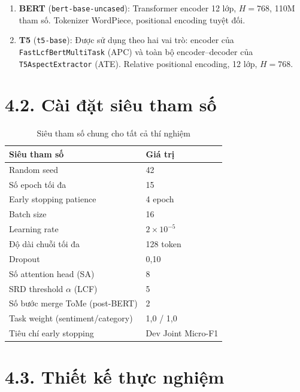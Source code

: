\begin{enumerate}
  \item \textbf{BERT} (\texttt{bert-base-uncased}): Transformer encoder
        12 lớp, $H{=}768$, 110M tham số. Tokenizer WordPiece, positional
        encoding tuyệt đối.
  \item \textbf{T5} (\texttt{t5-base}): Được sử dụng theo hai vai trò:
        encoder của \texttt{FastLcfBertMultiTask} (APC) và toàn bộ
        encoder–decoder của \texttt{T5AspectExtractor} (ATE). Relative
        positional encoding, 12 lớp, $H{=}768$.
\end{enumerate}

\section{4.2.\; Cài đặt siêu tham số}
\label{sec:hyperparams}

\begin{table}[H]
\centering
\caption{Siêu tham số chung cho tất cả thí nghiệm}
\label{tab:hyperparams}
\begin{tabular}{@{}ll@{}}
\toprule
\textbf{Siêu tham số} & \textbf{Giá trị} \\
\midrule
Random seed                    & 42 \\
Số epoch tối đa                & 15 \\
Early stopping patience        & 4 epoch \\
Batch size                     & 16 \\
Learning rate                  & $2 \times 10^{-5}$ \\
Độ dài chuỗi tối đa            & 128 token \\
Dropout                        & 0,10 \\
Số attention head (SA)         & 8 \\
SRD threshold $\alpha$ (LCF)   & 5 \\
Số bước merge ToMe (post-BERT) & 2 \\
Task weight (sentiment/category) & 1,0 / 1,0 \\
Tiêu chí early stopping        & Dev Joint Micro-F1 \\
\bottomrule
\end{tabular}
\end{table}

\section{4.3.\; Thiết kế thực nghiệm}
\label{sec:exp_design}

